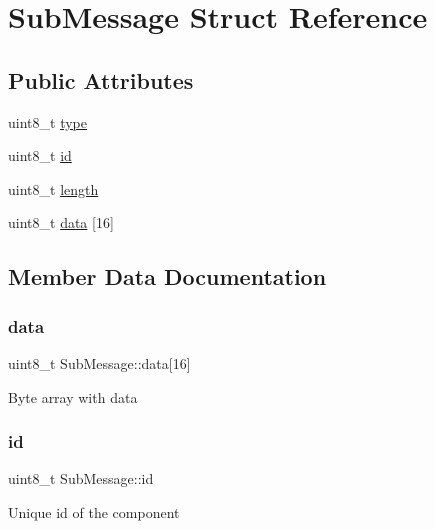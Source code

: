 \hypertarget{struct_sub_message}{}\section{Sub\+Message Struct Reference}
\label{struct_sub_message}
\subsection*{Public Attributes}
\begin{DoxyCompactItemize}
\item 
uint8\+\_\+t \hyperlink{struct_sub_message_a064f1d26d553da776dc749d37a18a499}{type}
\item 
uint8\+\_\+t \hyperlink{struct_sub_message_af3acc450c0686d7a9d15ccd9d548cb6d}{id}
\item 
uint8\+\_\+t \hyperlink{struct_sub_message_a276e06f5335ca7857c21ac8c0e51bd6d}{length}
\item 
uint8\+\_\+t \hyperlink{struct_sub_message_a7d923c5cdaa380c27d7c4cf60ea7c1be}{data} \mbox{[}16\mbox{]}
\end{DoxyCompactItemize}


\subsection{Member Data Documentation}
\mbox{\label{struct_sub_message_a7d923c5cdaa380c27d7c4cf60ea7c1be}} 
\subsubsection{\texorpdfstring{data}{data}}
{\footnotesize\ttfamily uint8\+\_\+t Sub\+Message\+::data\mbox{[}16\mbox{]}}

Byte array with data \mbox{\label{struct_sub_message_af3acc450c0686d7a9d15ccd9d548cb6d}} 
\subsubsection{\texorpdfstring{id}{id}}
{\footnotesize\ttfamily uint8\+\_\+t Sub\+Message\+::id}

Unique id of the component \mbox{\label{struct_sub_message_a276e06f5335ca7857c21ac8c0e51bd6d}} 
